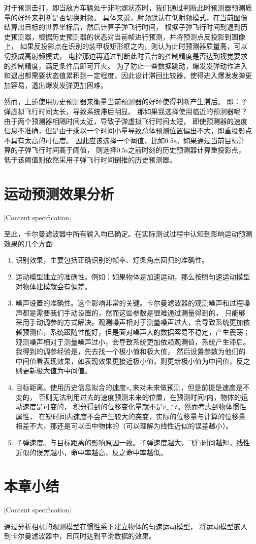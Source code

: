 对于预测击打，即当敌方车辆处于非陀螺状态时，我们通过判断此时预测器预测质量的好坏来判断是否切换射频。
具体来说，射频默认在低射频模式，在当前图像结算出目标的世界坐标后，然后计算子弹飞行时间，
根据子弹飞行时间到退到历史预测器，根据历史预测器的状态对当前帧进行预测，并将预测点反投影到图像上，
如果反投影点在识别的装甲板矩形框之内，则认为此时预测器质量高，可以切换成高射频模式，
电控那边再通过判断此时云台的控制精度是否达到视觉要求的控制精度，满足条件后即可开火。
为了防止一些数据跳动，爆发发弹动作进入和退出都需要状态值累积到一定程度，因此设计滞回比较器，使得进入爆发发弹更加容易，退出爆发发弹更加困难。

然而，上述使用历史预测器来衡量当前预测器的好坏使得判断产生滞后。
即：子弹虚拟飞行时间太长，导致系统滞后明显。
那如果我选择使用临近的预测器呢？由于两个预测器相隔时间太近，导致子弹虚拟飞行时间太短，
即使预测器的速度信息不准确，但是由于乘以一个时间小量导致总体预测位置偏出不大，即重投影点不具有太高的可信度。
因此应该选择一个阈值，比如0.5s。如果通过当前目标计算的子弹飞行时间高于阈值，
则选择0.5s之前时刻的历史预测器计算重投影点，低于该阈值则依然采用子弹飞行时间倒推的历史预测器。




\section{运动预测效果分析}[Content specification]

至此，卡尔曼滤波器中所有输入均已确定。在实际测试过程中认知到影响运动预测效果的几个方面:
\begin{enumerate}[itemsep=2pt,topsep=0pt,parsep=0pt]
    \item 识别效果，主要包括正确识别的帧率、灯条角点回归的准确性。
    \item 运动模型建立的准确性。例如：如果物体是加速运动，那么按照匀速运动模型对物体建模就会有偏差。
    \item 噪声设置的准确性。这个影响非常的关键。卡尔曼滤波器的观测噪声和过程噪声都是需要我们手动设置的，然而这些参数是很难通过测量得到的，
    只能够采用手动调参的方式解决。观测噪声相对于测量噪声过大，会导致系统更加依赖预测值，系统跟随性能好，但是面对噪声大的数据容易不稳定，产生震荡；
    观测噪声相对于测量噪声过小，会导致系统更加依赖观测值，系统产生滞后。我得到的调参经验是，先去找一个极小值和极大值，
    然后设置参数为他们的中间值看表现效果，如表现效果更接近极小值，则更新极小值为中间值，反之则更新极大值为中间值。
    \item 目标距离。使用历史信息拟合的速度$v_x$来对未来做预测，但是前提是速度是不变的，
    否则无法利用过去的速度预测未来的位置，在预测时间$t$内，物体的运动速度是可变的，
    积分得到的位移变化量就不是$v_x*t$。然而考虑到物体惯性属性，
    在短时间内速度不会产生较大的突变，实际的位移量与计算的位移量相差不大，那还是可以击中物体的（可以理解为线性近似的误差越小）。
    \item 子弹速度。与目标距离的影响原因一致。子弹速度越大，飞行时间越短，线性近似的误差越小，命中率越高，反之命中率越低。

\end{enumerate}

\section{本章小结}[Content specification]

通过分析相机的观测模型在惯性系下建立物体的匀速运动模型，
将运动模型嵌入到卡尔曼滤波器中，且同时达到平滑数据的效果。


